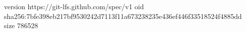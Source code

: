 version https://git-lfs.github.com/spec/v1
oid sha256:7bfe398eb217bf9530242d7113f11a673238235e436ef446f33518524f4885dd
size 786528
